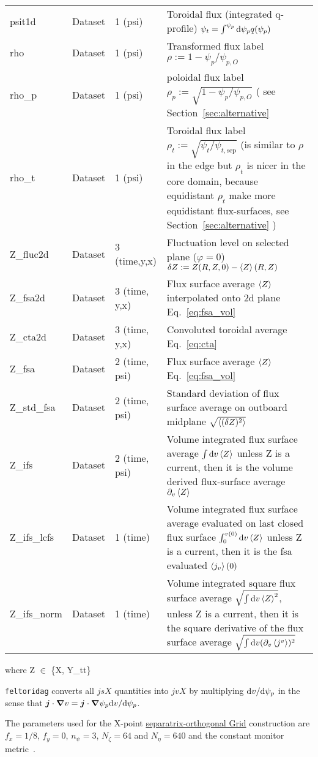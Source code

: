 \begin{longtable}{lll>{\RaggedRight}p{7cm}}
psit1d           & Dataset & 1 (psi) & Toroidal flux (integrated q-profile) $\psi_t = \int^{\psi_p} \mathrm{d}\psi_p q(\psi_p)$ \\
rho              & Dataset & 1 (psi) & Transformed flux label $\rho:= 1 - \psi_p/\psi_{p,O}$ \\
rho\_p           & Dataset & 1 (psi) & poloidal flux label $\rho_p:= \sqrt{1 - \psi_p/\psi_{p,O}}$  ( see Section~\ref{sec:alternative}\\
    rho\_t           & Dataset & 1 (psi) & Toroidal flux label $\rho_t :=
    \sqrt{\psi_t/\psi_{t,\mathrm{sep}}}$ (is similar to $\rho$ in the edge but
    $\rho_t$ is nicer in the core domain, because equidistant $\rho_t$ make
more equidistant flux-surfaces, see Section~\ref{sec:alternative} )\\
Z\_fluc2d        & Dataset & 3 (time,y,x) & Fluctuation level on selected plane ($\varphi= 0$) $\delta Z := Z(R,Z,0) - \left \langle  Z \right \rangle(R,Z)$ \\
Z\_fsa2d         & Dataset & 3 (time, y,x) & Flux surface average $\left \langle  Z \right \rangle$ interpolated onto 2d plane Eq.~\eqref{eq:fsa_vol} \\
Z\_cta2d         & Dataset & 3 (time, y,x) & Convoluted toroidal average Eq.~\eqref{eq:cta} \\
Z\_fsa           & Dataset & 2 (time, psi) & Flux surface average $\left \langle  Z \right \rangle$ Eq.~\eqref{eq:fsa_vol} \\
Z\_std\_fsa      & Dataset & 2 (time, psi) & Standard deviation of flux surface average on outboard midplane $\sqrt{\left \langle (\delta Z)^2 \right \rangle}$ \\
Z\_ifs           & Dataset & 2 (time, psi) & Volume integrated flux surface average $\int\mathrm{d} v\left \langle  Z \right \rangle$ unless Z is a current, then it is the volume derived flux-surface average $\partial_v \left \langle  Z \right \rangle$ \\
Z\_ifs\_lcfs     & Dataset & 1 (time) & Volume integrated flux surface average evaluated on last closed flux surface $\int_0^{v(0)}\mathrm{d} v\left \langle  Z \right \rangle$ unless Z is a current, then it is the fsa evaluated $\left \langle  j_v \right \rangle(0)$ \\
Z\_ifs\_norm     & Dataset & 1 (time) & Volume integrated square flux surface average $\sqrt{\int \mathrm{d} v \left \langle Z \right \rangle^2}$, unless Z is a current, then it is the square derivative of the flux surface average $\sqrt{\int\mathrm{d} v (\partial_v \left \langle j^v \right \rangle)^2}$\\
\bottomrule
\end{longtable}
where Z $\in$ \{X, Y\_tt\}
\begin{tcolorbox}[title=Note]
    \texttt{feltoridag} converts all $jsX$ quantities into $jvX$
by multiplying $\mathrm{d} v/\mathrm{d} \psi_p$
in the sense that ${\boldsymbol{j}}\cdot{\boldsymbol{\nabla}} v  = {\boldsymbol{j}} \cdot{\boldsymbol{\nabla}} \psi_p \mathrm{d} v/\mathrm{d}\psi_p$.
\end{tcolorbox}
The parameters used for the X-point
\href{https://feltor-dev.github.io/doc/geometries/html/structdg_1_1geo_1_1_separatrix_orthogonal.html}{separatrix-orthogonal Grid}
construction are $f_x = 1/8$, $f_y = 0$, $n_\psi = 3$, $N_\zeta = 64$ and
$N_\eta = 640$ and the constant monitor metric~\cite{Wiesenberger2018}.

